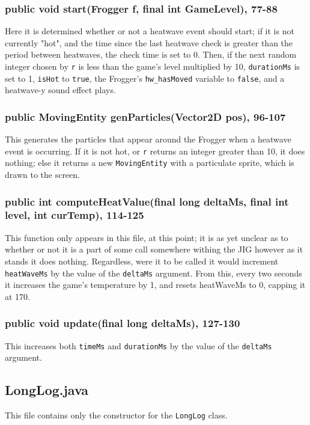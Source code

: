 \documentclass[12pt]{article}
\begin{document}
\subsubsection{public void start(Frogger f, final int GameLevel), 77-88}
Here it is determined whether or not a heatwave event should start; if it is not currently "hot", and the time since the last heatwave check is greater than the period between heatwaves, the check time is set to 0.
Then, if the next random integer chosen by \verb|r| is less than the game's level multiplied by 10, \verb|durationMs| is set to 1, \verb|isHot| to \verb|true|, the Frogger's \verb|hw_hasMoved| variable to \verb|false|, and a heatwave-y sound effect plays.

\subsubsection{public MovingEntity genParticles(Vector2D pos), 96-107}
This generates the particles that appear around the Frogger when a heatwave event is occurring.
If it is not hot, or \verb|r| returns an integer greater than 10, it does nothing; else it returns a new \verb|MovingEntity| with a particulate sprite, which is drawn to the screen.

\subsubsection{public int computeHeatValue(final long deltaMs, final int level, int curTemp), 114-125}
This function only appears in this file, at this point; it is as yet unclear as to whether or not it is a part of some call somewhere withing the JIG however as it stands it does nothing.
Regardless, were it to be called it would increment \verb|heatWaveMs| by the value of the \verb|deltaMs| argument.
From this, every two seconds it increases the game's temperature by 1, and resets heatWaveMs to 0, capping it at 170.

\subsubsection{public void update(final long deltaMs), 127-130}
This increases both \verb|timeMs| and \verb|durationMs| by the value of the \verb|deltaMs| argument.

\subsection{LongLog.java}
This file contains only the constructor for the \verb|LongLog| class.
\end{document}

